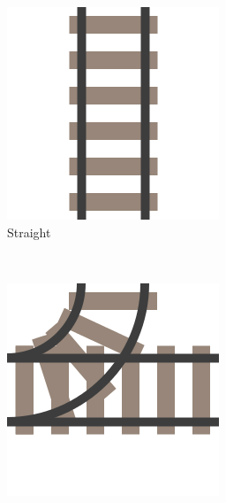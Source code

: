 \documentclass[a4paper,10pt]{report}
\begin{document}
\begin{figure}[h]
	\centering
	\captionsetup[subfigure]{justification=centering}
	\begin{subfigure}[t]{.20\linewidth}
		\includegraphics[width=\textwidth]{straight-rail.png}
		\caption{Straight}
		\label{fig:rail-cell-straight}
	\end{subfigure}%
	~
	\begin{subfigure}[t]{.20\linewidth}
		\includegraphics[width=\textwidth]{simple-switch-rail.png}

\end{subfigure}
\end{figure}
\end{document}
